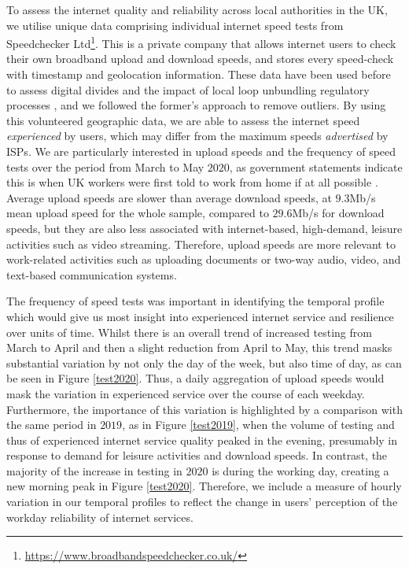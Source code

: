 \documentclass[]{interact}
\theoremstyle{plain}%
\theoremstyle{definition}
\theoremstyle{remark}
\begin{document}
To assess the internet quality and reliability across local authorities
in the UK, we utilise unique data comprising individual internet speed
tests from Speedchecker Ltd\footnote{\url{https://www.broadbandspeedchecker.co.uk/}}.
This is a private company that allows internet users to check their own
broadband upload and download speeds, and stores every speed-check with
timestamp and geolocation information. These data have been used before
to assess digital divides \citep{riddlesden2014broadband} and the impact
of local loop unbundling regulatory processes
\citep{nardotto2015unbundling}, and we followed the former's approach to
remove outliers. By using this volunteered geographic data, we are able
to assess the internet speed \emph{experienced} by users, which may
differ from the maximum speeds \emph{advertised} by ISPs. We are
particularly interested in upload speeds and the frequency of speed
tests over the period from March to May \(2020\), as government
statements indicate this is when UK workers were first told to work from
home if at all possible \citep{GovUK2020}. Average upload speeds are
slower than average download speeds, at \(9.3\)Mb/s mean upload speed
for the whole sample, compared to \(29.6\)Mb/s for download speeds, but
they are also less associated with internet-based, high-demand, leisure
activities such as video streaming. Therefore, upload speeds are more
relevant to work-related activities such as uploading documents or
two-way audio, video, and text-based communication systems.

The frequency of speed tests was important in identifying the temporal
profile which would give us most insight into experienced internet
service and resilience over units of time. Whilst there is an overall
trend of increased testing from March to April and then a slight
reduction from April to May, this trend masks substantial variation by
not only the day of the week, but also time of day, as can be seen in
Figure \ref{test2020}. Thus, a daily aggregation of upload speeds would
mask the variation in experienced service over the course of each
weekday. Furthermore, the importance of this variation is highlighted by
a comparison with the same period in \(2019\), as in Figure
\ref{test2019}, when the volume of testing and thus of experienced
internet service quality peaked in the evening, presumably in response
to demand for leisure activities and download speeds. In contrast, the
majority of the increase in testing in \(2020\) is during the working
day, creating a new morning peak in Figure \ref{test2020}. Therefore, we
include a measure of hourly variation in our temporal profiles to
reflect the change in users' perception of the workday reliability of
internet services.
\end{document}
